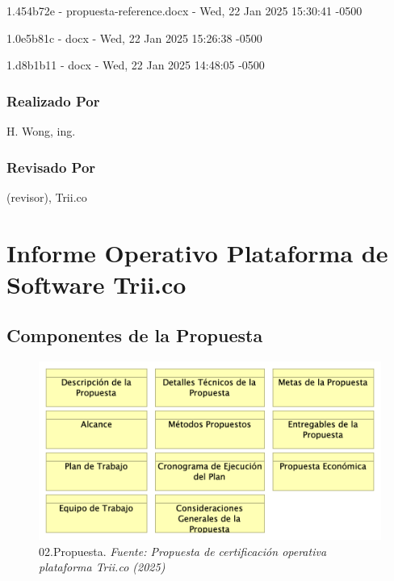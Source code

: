 \documentclass[
  paper=a4,
  ,captions=tableheading
]{scrartcl}
\renewenvironment{quote}{\begin{customblockquote}\list{}{\rightmargin=0em\leftmargin=0em}%
\item\relax\color{blockquote-text}\ignorespaces}{\unskip\unskip\endlist\end{customblockquote}}
\begin{document}
1.454b72e - propuesta-reference.docx - Wed, 22 Jan 2025 15:30:41 -0500

1.0e5b81c - docx - Wed, 22 Jan 2025 15:26:38 -0500

1.d8b1b11 - docx - Wed, 22 Jan 2025 14:48:05 -0500

\subsubsection{Realizado Por}\label{sec:realizado-por}

H. Wong, ing.

\subsubsection{Revisado Por}\label{sec:revisado-por}

(revisor), Trii.co

\newpage

\section{Informe Operativo Plataforma de Software
Trii.co}\label{sec:informe-operativo-plataforma-de-software-trii.co}

\subsection{Componentes de la
Propuesta}\label{sec:componentes-de-la-propuesta}

\begin{quote}
\end{quote}

\begin{figure}
\centering
\includegraphics{images/02.Propuesta.png}
\caption{02.Propuesta. \emph{Fuente: Propuesta de certificación
operativa plataforma Trii.co
(2025)}}\label{fig:id-dd2f1c1c1816447380fe900b66faa8bc}
\end{figure}
\end{document}
